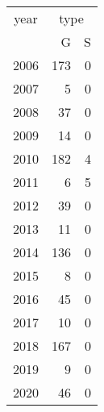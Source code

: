 \footnotesize\begin{tabular}[t]{lrr}
\toprule
\multicolumn{1}{c}{year} & \multicolumn{2}{c}{type} \\
\cmidrule(l{3pt}r{3pt}){1-1} \cmidrule(l{3pt}r{3pt}){2-3}
  & G & S\\
\midrule
2006 & 173 & 0\\
2007 & 5 & 0\\
2008 & 37 & 0\\
2009 & 14 & 0\\
2010 & 182 & 4\\
2011 & 6 & 5\\
2012 & 39 & 0\\
2013 & 11 & 0\\
2014 & 136 & 0\\
2015 & 8 & 0\\
2016 & 45 & 0\\
2017 & 10 & 0\\
2018 & 167 & 0\\
2019 & 9 & 0\\
2020 & 46 & 0\\
\bottomrule
\end{tabular}
